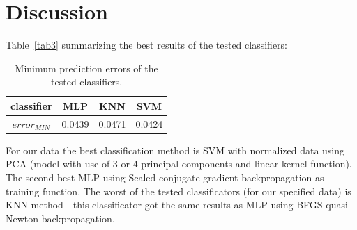 \documentclass[
10pt, %
a4paper, %
oneside, %
headinclude,footinclude, %
BCOR5mm, %
]{scrartcl}
\begin{document}

\section{Discussion}

Table~\vref{tab3} summarizing the best results of the tested classifiers:

\begin{table}[H]
	\centering
	\begin{tabular}{ c | c | c | c  }
    classifier  & MLP & KNN & SVM \\ \hline
    $ error_{MIN} $ & 0.0439 & 0.0471 & \cellcolor{amber!25}0.0424 \\
  	\end{tabular}
  	\caption{Minimum prediction errors of the tested classifiers.}
  	\label{tab3}
\end{table}

For our data the best classification method is SVM with normalized data using PCA (model with use of 3 or 4 principal components and linear kernel function). The second best MLP using Scaled conjugate gradient backpropagation as training function. The worst of the tested classificators (for our specified data) is KNN method - this classificator got the same results as MLP using BFGS quasi-Newton backpropagation.


\renewcommand{\refname}{\spacedlowsmallcaps{References}} %




\end{document}
